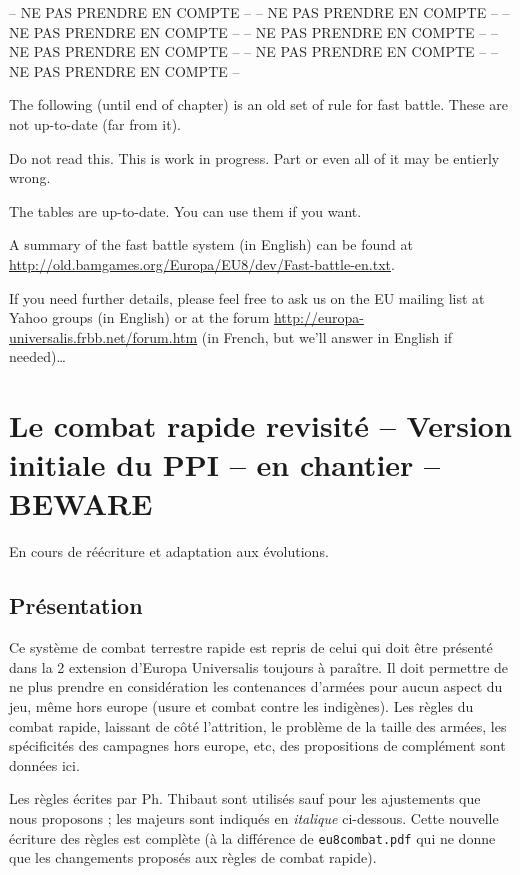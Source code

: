 
-- NE PAS PRENDRE EN COMPTE --
-- NE PAS PRENDRE EN COMPTE --
-- NE PAS PRENDRE EN COMPTE --
-- NE PAS PRENDRE EN COMPTE --
-- NE PAS PRENDRE EN COMPTE --
-- NE PAS PRENDRE EN COMPTE --
-- NE PAS PRENDRE EN COMPTE --

\begin{designnote}
The following (until end of chapter) is an old set of rule for fast
battle. These are not up-to-date (far from it).

Do not read this. This is work in progress. Part or even all of it may be
entierly wrong.

The tables are up-to-date. You can use them if you want.

A summary of the fast battle system (in English) can be found at
\url{http://old.bamgames.org/Europa/EU8/dev/Fast-battle-en.txt}.

If you need further details, please feel free to ask us on the EU mailing list
at Yahoo groups (in English) or at the forum
\url{http://europa-universalis.frbb.net/forum.htm} (in French, but we'll
answer in English if needed)\ldots
\end{designnote}

\section{Le combat rapide revisité -- Version initiale du PPI -- en chantier -- BEWARE}

En cours de réécriture et adaptation aux évolutions.

\subsection{Présentation}

Ce système de combat terrestre rapide est repris de celui qui doit être présenté 
dans la 2 extension d'Europa Universalis toujours à paraître. Il doit 
permettre de ne plus prendre en considération les contenances d'armées 
pour aucun aspect du jeu, même hors europe (usure et combat contre les 
indigènes). Les règles du combat rapide, laissant de côté l'attrition, le 
problème de la taille des armées, les spécificités des campagnes hors europe, 
etc, des propositions de complément sont données ici. 


Les règles écrites par Ph. Thibaut sont utilisés sauf pour les ajustements
que nous proposons ; les majeurs sont indiqués
en \textit{italique} ci-dessous.
Cette nouvelle écriture des règles est complète (à la différence de 
\texttt{eu8combat.pdf} qui ne donne que les changements proposés aux règles
de combat rapide).

